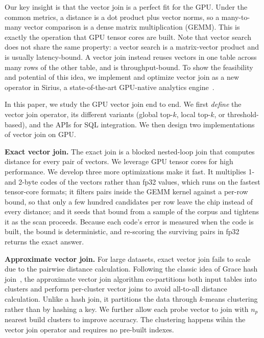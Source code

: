 Our key insight is that the vector join is a perfect fit for the GPU.
Under the common metrics, a distance is a dot product plus vector norms, so a many-to-many vector comparison is a dense matrix multiplication (GEMM). This is exactly the operation that GPU tensor cores are built. %
Note that vector search does not share the same property: a vector search is a matrix-vector product and is usually latency-bound. %
A vector join instead reuses vectors in one table across many rows of the other table, and is throughput-bound.
To show the feasibility and potential of this idea, we implement and optimize vector join as a new operator in Sirius, a state-of-the-art GPU-native analytics engine~\cite{Yogatama26}.

In this paper, we study the GPU vector join end to end.
We first \emph{define} the vector join operator, its different variants (global top-$k$, local top-$k$, or threshold-based), and the APIs for SQL integration.
We then design two implementations of vector join on GPU.

\noindent\textbf{Exact vector join.}
The exact join is a blocked nested-loop join that computes distance for every pair of vectors. We leverage GPU tensor cores for high performance.
We develop three more optimizations make it fast. 
It multiplies 1- and 2-byte codes of the vectors rather than fp32 values, which runs on the fastest tensor-core formats; it filters pairs inside the GEMM kernel against a per-row bound, so that only a few hundred candidates per row leave the chip instead of every distance; and it seeds that bound from a sample of the corpus and tightens it as the scan proceeds.
Because each code's error is measured when the code is built, the bound is deterministic, and re-scoring the surviving pairs in fp32 returns the exact answer.

\noindent\textbf{Approximate vector join.}
For large datasets, exact vector join fails to scale due to the pairwise distance calculation. Following the classic idea of Grace hash join~\cite{KitsuregawaGrace83}, the approximate vector join algorithm co-partitions both input tables into clusters and perform per-cluster vector joins to avoid all-to-all distance calculation.
Unlike a hash join, it partitions the data through $k$-means clustering rather than by hashing a key. We further allow each probe vector to join with $n_p$ nearest build clusters to improve accuracy.
The clustering happens wihin the vector join operator and requires no pre-built indexes.

